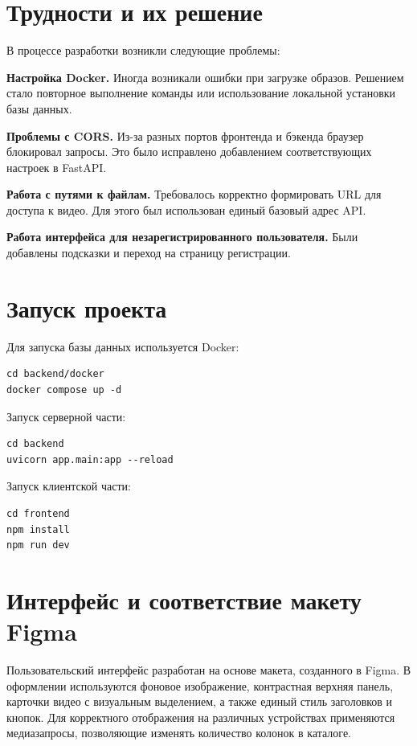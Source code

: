\section{Трудности и их решение}

В процессе разработки возникли следующие проблемы:

\textbf{Настройка Docker.} Иногда возникали ошибки при загрузке образов. Решением стало повторное выполнение команды или использование локальной установки базы данных.

\textbf{Проблемы с CORS.} Из-за разных портов фронтенда и бэкенда браузер блокировал запросы. Это было исправлено добавлением соответствующих настроек в FastAPI.

\textbf{Работа с путями к файлам.} Требовалось корректно формировать URL для доступа к видео. Для этого был использован единый базовый адрес API.

\textbf{Работа интерфейса для незарегистрированного пользователя.} Были добавлены подсказки и переход на страницу регистрации.

\section{Запуск проекта}

Для запуска базы данных используется Docker:
\begin{verbatim}
cd backend/docker
docker compose up -d
\end{verbatim}

Запуск серверной части:
\begin{verbatim}
cd backend
uvicorn app.main:app --reload
\end{verbatim}

Запуск клиентской части:
\begin{verbatim}
cd frontend
npm install
npm run dev
\end{verbatim}

\section{Интерфейс и соответствие макету Figma}

Пользовательский интерфейс разработан на основе макета, созданного в Figma. В оформлении используются фоновое изображение, контрастная верхняя панель, карточки видео с визуальным выделением, а также единый стиль заголовков и кнопок. Для корректного отображения на различных устройствах применяются медиазапросы, позволяющие изменять количество колонок в каталоге.

